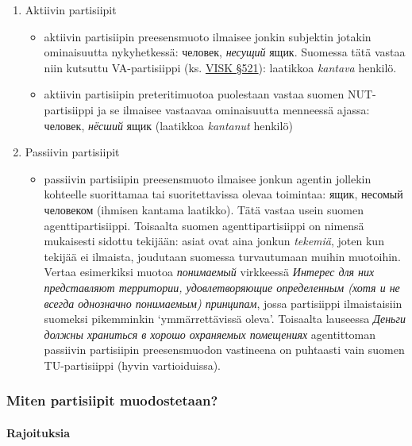 \documentclass[]{scrartcl}
\providecommand{\tightlist}{%
  \setlength{\itemsep}{0pt}\setlength{\parskip}{0pt}}
\begin{document}
\begin{enumerate}
\def\labelenumi{\arabic{enumi}.}
\tightlist
\item
  Aktiivin partisiipit

  \begin{itemize}
  \tightlist
  \item
    aktiivin partisiipin preesensmuoto ilmaisee jonkin subjektin jotakin
    ominaisuutta nykyhetkessä: человек, \emph{несущий} ящик. Suomessa
    tätä vastaa niin kutsuttu VA-partisiippi (ks.
    \href{http://scripta.kotus.fi/visk/sisallys.php?p=521}{VISK §521}):
    laatikkoa \emph{kantava} henkilö.
  \item
    aktiivin partisiipin preteritimuotoa puolestaan vastaa suomen
    NUT-partisiippi ja se ilmaisee vastaavaa ominaisuutta menneessä
    ajassa: человек, \emph{нёсший} ящик (laatikkoa \emph{kantanut}
    henkilö)
  \end{itemize}
\item
  Passiivin partisiipit

  \begin{itemize}
  \tightlist
  \item
    passiivin partisiipin preesensmuoto ilmaisee jonkun agentin jollekin
    kohteelle suorittamaa tai suoritettavissa olevaa toimintaa: ящик,
    несомый человеком (ihmisen kantama laatikko). Tätä vastaa usein
    suomen agenttipartisiippi. Toisaalta suomen agenttipartisiippi on
    nimensä mukaisesti sidottu tekijään: asiat ovat aina jonkun
    \emph{tekemiä}, joten kun tekijää ei ilmaista, joudutaan suomessa
    turvautumaan muihin muotoihin. Vertaa esimerkiksi muotoa
    \emph{понимаемый} virkkeessä \emph{Интерес для них представляют
    территории, удовлетворяющие определенным (хотя и не всегда
    однозначно понимаемым) принципам}, jossa partisiippi ilmaistaisiin
    suomeksi pikemminkin `ymmärrettävissä oleva'. Toisaalta lauseessa
    \emph{Деньги должны храниться в хорошо охраняемых помещениях}
    agentittoman passiivin partisiipin preesensmuodon vastineena on
    puhtaasti vain suomen TU-partisiippi (hyvin vartioiduissa).
  \end{itemize}
\end{enumerate}

\subsubsection{Miten partisiipit
muodostetaan?}\label{miten-partisiipit-muodostetaan}

\paragraph{Rajoituksia}\label{rajoituksia}
\end{document}
